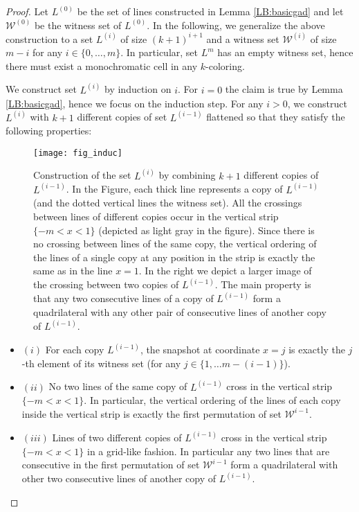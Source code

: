 \documentclass[11pt,a4paper]{article}
\begin{document}
\begin{proof}
Let $L^{(0)}$ be the set of lines constructed in Lemma \ref{LB:basicgad} and let $\mathcal{W}^{(0)}$ be the witness set of $L^{(0)}$. In the following, we generalize the above construction to a set $L^{(i)}$ of size $(k+1)^{i+1}$  and a witness set $\mathcal{W}^{(i)}$ of size $m-i$ for any $i \in \{0,\ldots, m\}$. In particular, set $L^m$ has an empty  witness set, hence there must exist a monochromatic cell in any $k$-coloring.

We construct set $L^{(i)}$ by induction on $i$. For $i=0$ the claim is true by Lemma \ref{LB:basicgad}, hence we focus on the induction step. For any $i>0$, we construct $L^{(i)}$ with $k+1$ different copies of set $L^{(i-1)}$ flattened so that they satisfy the following properties:

\begin{figure}
   \begin{center}
     \texttt{[image: fig\_induc]}
     \caption{Construction of the set $L^{(i)}$ by combining $k+1$ different copies of $L^{(i-1)}$. In the Figure, each thick line represents a copy of $L^{(i-1)}$ (and the dotted vertical lines the witness set). All the crossings between lines of different copies occur in the vertical strip $\{-m<x<1\}$ (depicted as light gray in the figure). Since there is no crossing between lines of the same copy, the vertical ordering of the lines of a single copy at any position in the strip is exactly the same as in the line $x=1$.
     In the right we depict a larger image of the crossing between two copies of $L^{(i-1)}$. The main property is that any two consecutive lines of a copy of $L^{(i-1)}$ form a quadrilateral with any other pair of consecutive lines of another copy of $L^{(i-1)}$.}
     \label{fig_induc}
   \end{center}
\end{figure}
\begin{itemize}
\item $(i)$ For each copy $L^{(i-1)}$, the snapshot at coordinate $x=j$ is exactly the $j$-th element of its witness set (for any $j\in \{1,\ldots m-(i-1)\}$).
\item $(ii)$ No two lines of the same copy  of $L^{(i-1)}$ cross in the vertical strip $\{-m<x<1\}$. In particular,  the vertical ordering of the lines of each copy inside the vertical strip is exactly the first permutation of set $\mathcal{W}^{i-1}$.
\item $(iii)$ Lines of two different copies of $L^{(i-1)}$ cross in the  vertical strip $\{-m<x<1\}$ in a grid-like fashion. In particular any two lines that are consecutive in the first permutation of set $\mathcal{W}^{i-1}$ form a quadrilateral with other two consecutive lines of another copy of $L^{(i-1)}$.

\end{itemize}
\end{proof}
\end{document}
